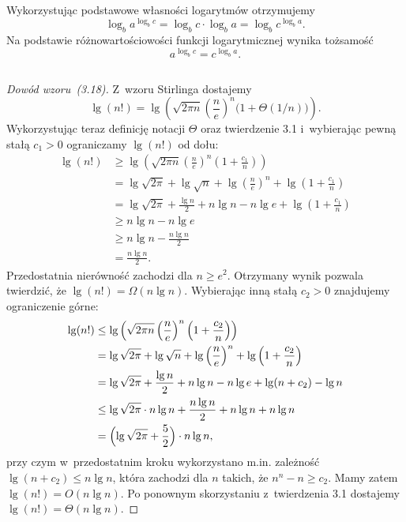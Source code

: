 \subsection{} %
Wykorzystując podstawowe własności logarytmów otrzymujemy
\[
	\log_ba^{\log_bc} = \log_bc\cdot\log_ba = \log_bc^{\log_ba}.
\]
Na podstawie różnowartościowości funkcji logarytmicznej wynika tożsamość
\[
	a^{\log_bc} = c^{\log_ba}.
\]

\subsection{} %
\begin{proof}[Dowód wzoru~(3.18)]
	Z~wzoru Stirlinga dostajemy
	\[
		\lg(n!) = \lg\left(\sqrt{2\pi n}\left(\frac{n}{e}\right)^n\bigl(1+\Theta(1/n)\bigr)\right).
	\]
	Wykorzystując teraz definicję notacji $\Theta$ oraz twierdzenie 3.1 i~wybierając pewną stałą $c_1>0$ ograniczamy $\lg(n!)$ od dołu:
	\begin{align*}
		\lg(n!) &\ge \lg\left(\sqrt{2\pi n}\left(\frac{n}{e}\right)^n\left(1+\frac{c_1}{n}\right)\right) \\
		&= \lg\sqrt{2\pi}+\lg\sqrt{n}+\lg\left(\frac{n}{e}\right)^n+\lg\left(1+\frac{c_1}{n}\right) \\
		&= \lg\sqrt{2\pi}+\frac{\lg n}{2}+n\lg n-n\lg e+\lg\left(1+\frac{c_1}{n}\right) \\
		&\ge n\lg n-n\lg e\\
		&\ge n\lg n-\frac{n\lg n}{2} \\
		&= \frac{n\lg n}{2}.
	\end{align*}
	Przedostatnia nierówność zachodzi dla $n\ge e^2$. Otrzymany wynik pozwala twierdzić, że $\lg(n!)=\Omega(n\lg n)$. Wybierając inną stałą $c_2>0$ znajdujemy ograniczenie górne:
	\begin{align*}
		\lg(n!) &\le \lg\left(\sqrt{2\pi n}\left(\frac{n}{e}\right)^n\left(1+\frac{c_2}{n}\right)\right) \\
		&= \lg\sqrt{2\pi}+\lg\sqrt{n}+\lg\left(\frac{n}{e}\right)^n+\lg\left(1+\frac{c_2}{n}\right) \\
		&= \lg\sqrt{2\pi}+\frac{\lg n}{2}+n\lg n-n\lg e+\lg(n+c_2)-\lg n\\
		&\le \lg\sqrt{2\pi}\cdot n\lg n+\frac{n\lg n}{2}+n\lg n+n\lg n\\
		&= \Bigl(\lg\sqrt{2\pi}+\frac{5}{2}\Bigr)\cdot n\lg n,
	\end{align*}
	przy czym w~przedostatnim kroku wykorzystano m.in. zależność $\lg(n+c_2)\le n\lg n$, która zachodzi dla $n$ takich, że $n^n-n\ge c_2$. Mamy zatem $\lg(n!)=O(n\lg n)$. Po ponownym skorzystaniu z~twierdzenia 3.1 dostajemy $\lg(n!)=\Theta(n\lg n)$.
\end{proof}

